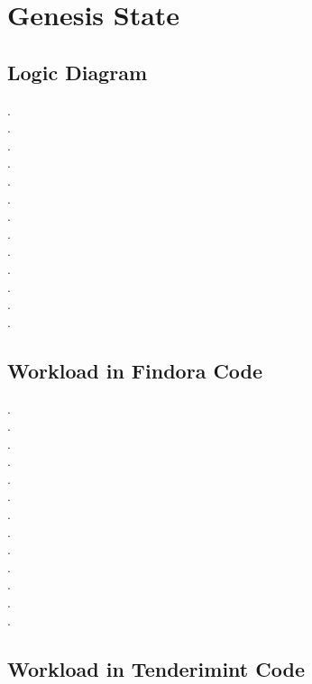\section{Genesis State}

\subsection{Logic Diagram}

. \\
. \\
. \\
. \\
. \\
. \\
. \\
. \\
. \\
. \\
. \\
. \\
. \\

\subsection{Workload in Findora Code}

. \\
. \\
. \\
. \\
. \\
. \\
. \\
. \\
. \\
. \\
. \\
. \\
. \\

\subsection{Workload in Tenderimint Code}

